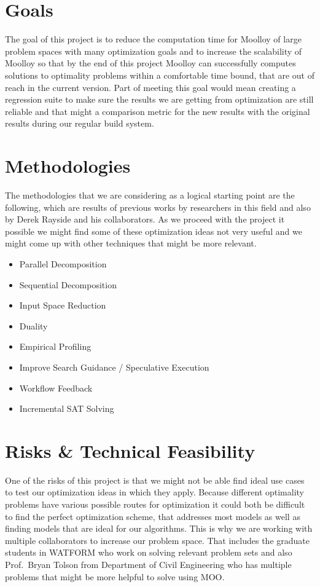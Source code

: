 \documentclass[11pt]{article}
\begin{document}
\section{Goals}
The goal of this project is to reduce the computation time for Moolloy
of large problem spaces with many optimization goals and to increase
the scalability of Moolloy so that by the end of this project Moolloy
can successfully computes solutions to optimality problems within a
comfortable time bound, that are out of reach in the current version.
Part of meeting this goal would mean creating a regression suite to
make sure the results we are getting from optimization are still
reliable and that might a comparison metric for the new results with
the original results during our regular build system.

\section{Methodologies}
The methodologies that we are considering as a logical starting point
are the following, which are results of previous works by researchers
in this field and also by Derek Rayside and his collaborators. As we
proceed with the project it possible we might find some of these
optimization ideas not very useful and we might come up with other
techniques that might be more relevant.

\begin{itemize}
  \item Parallel Decomposition
  \item Sequential Decomposition
  \item Input Space Reduction
  \item Duality
  \item Empirical Profiling
  \item Improve Search Guidance / Speculative Execution
  \item Workflow Feedback
  \item Incremental SAT Solving
\end{itemize}

\section{Risks \& Technical Feasibility}
One of the risks of this project is that we might not be able find
ideal use cases to test our optimization ideas in which they apply.
Because different optimality problems have various possible routes for
optimization it could both be difficult to find the perfect
optimization scheme, that addresses most models as well as finding
models that are ideal for our algorithms. This is why we are working
with multiple collaborators to increase our problem space. That
includes the graduate students in WATFORM who work on solving relevant
problem sets and also Prof.\ Bryan Tolson from Department of Civil
Engineering who has multiple problems that might be more helpful to
solve using MOO.\@
\end{document}
